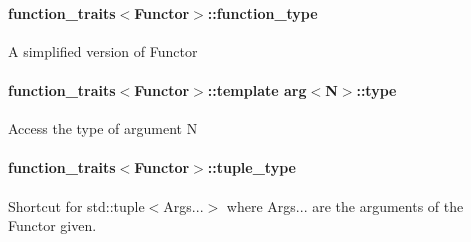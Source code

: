 \paragraph*{{\ttfamily function\+\_\+traits$<$Functor$>$\+::function\+\_\+type}}

A simplified version of Functor

\paragraph*{{\ttfamily function\+\_\+traits$<$Functor$>$\+::template arg$<$N$>$\+::type}}

Access the type of argument {\ttfamily N}

\paragraph*{{\ttfamily function\+\_\+traits$<$Functor$>$\+::tuple\+\_\+type}}

Shortcut for {\ttfamily std\+::tuple$<$Args...$>$} where {\ttfamily Args...} are the arguments of the Functor given. 